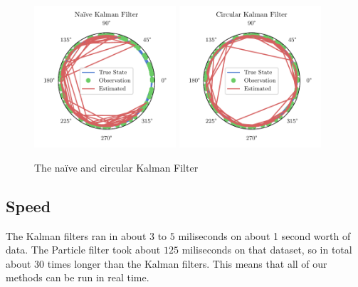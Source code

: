 \documentclass[11pt]{amsart}
\begin{document}
\begin{figure}[htp]
    \centering
    \includegraphics[width=0.47\textwidth]{actual_paper_graphs/non_altered_kalman.pdf}\hfill
    \includegraphics[width=0.47\textwidth]{actual_paper_graphs/altered_kalman.pdf}\hfill
    \caption{The naïve and circular Kalman Filter}
    \label{fig:simple_kalman}
\end{figure}

\subsection{Speed}
The Kalman filters ran in about $3$ to $5$ miliseconds on about 1 second worth of data. The Particle filter took about $125$ miliseconds on that dataset, so in total about $30$ times longer than the Kalman filters.
This means that all of our methods can be run in real time. 
\end{document}
